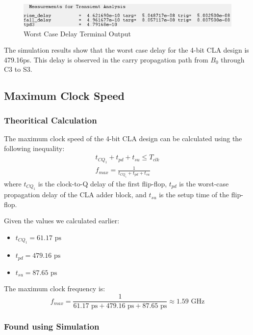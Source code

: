 \documentclass[conference]{IEEEtran}
\begin{document}
\begin{figure}[H]
    \centering
    \includegraphics[width=1\linewidth]{clapreworstterm.png}
    \caption{Worst Case Delay Terminal Output}
    \label{fig:worst_case_delay}
\end{figure}

The simulation results show that the worst case delay for the 4-bit CLA design is 479.16ps. This delay is observed in the carry propagation path from $B_0$ through C3 to S3.

\subsection{Maximum Clock Speed}

\subsubsection{Theoritical Calculation}
The maximum clock speed of the 4-bit CLA design can be calculated using the following inequality:
    \begin{align}
        t_{CQ_1} + t_{pd} + t_{su} \leq T_{clk} \\
        f_{max} = \frac{1}{t_{CQ_1} + t_{pd} + t_{su}}
    \end{align}
    where $t_{CQ_1}$ is the clock-to-Q delay of the first flip-flop, $t_{pd}$ is the worst-case propagation delay of the CLA adder block, and $t_{su}$ is the setup time of the flip-flop.

    Given the values we calculated earlier:
    \begin{itemize}
        \item $t_{CQ_1} = 61.17 \text{ ps}$
        \item $t_{pd} = 479.16 \text{ ps}$
        \item $t_{su} = 87.65 \text{ ps}$
    \end{itemize}

    The maximum clock frequency is:
    \begin{equation}
        f_{max} = \frac{1}{61.17 \text{ ps} + 479.16 \text{ ps} + 87.65 \text{ ps}} \approx 1.59 \text{ GHz}
    \end{equation}

\subsubsection{Found using Simulation}
\end{document}
